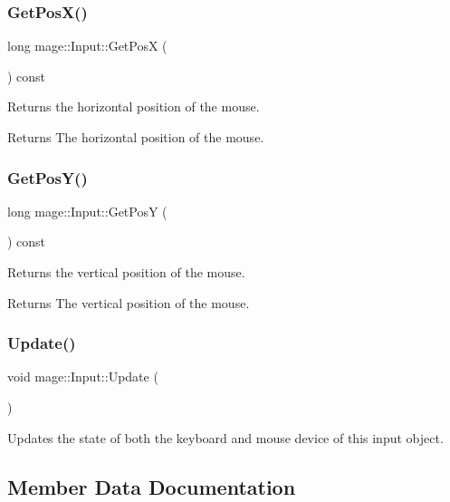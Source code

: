 \subsubsection{\texorpdfstring{Get\+Pos\+X()}{GetPosX()}}
{\footnotesize\ttfamily long mage\+::\+Input\+::\+Get\+PosX (\begin{DoxyParamCaption}{ }\end{DoxyParamCaption}) const}

Returns the horizontal position of the mouse.

\begin{DoxyReturn}{Returns}
The horizontal position of the mouse. 
\end{DoxyReturn}
\hypertarget{classmage_1_1_input_a4c7d46233ccf74d45c28549e5ecdd244}{}\label{classmage_1_1_input_a4c7d46233ccf74d45c28549e5ecdd244} 
\subsubsection{\texorpdfstring{Get\+Pos\+Y()}{GetPosY()}}
{\footnotesize\ttfamily long mage\+::\+Input\+::\+Get\+PosY (\begin{DoxyParamCaption}{ }\end{DoxyParamCaption}) const}

Returns the vertical position of the mouse.

\begin{DoxyReturn}{Returns}
The vertical position of the mouse. 
\end{DoxyReturn}
\hypertarget{classmage_1_1_input_ab152509540c3f41d337296edc2aea660}{}\label{classmage_1_1_input_ab152509540c3f41d337296edc2aea660} 
\subsubsection{\texorpdfstring{Update()}{Update()}}
{\footnotesize\ttfamily void mage\+::\+Input\+::\+Update (\begin{DoxyParamCaption}{ }\end{DoxyParamCaption})}

Updates the state of both the keyboard and mouse device of this input object. 

\subsection{Member Data Documentation}
\hypertarget{classmage_1_1_input_a6169d17f5a782039c7aefd0ffc5ba1bf}{}\label{classmage_1_1_input_a6169d17f5a782039c7aefd0ffc5ba1bf} 
